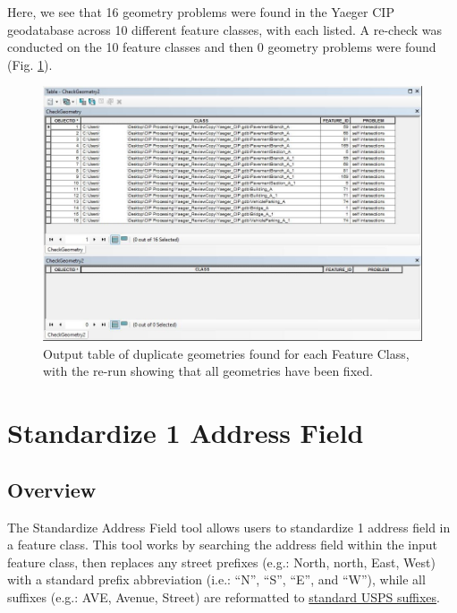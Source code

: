 \documentclass[openany]{book}
\theoremstyle{definition}
\theoremstyle{definition}
\theoremstyle{definition}
\theoremstyle{remark}
\begin{document}
Here, we see that 16 geometry problems were found in the Yaeger CIP
geodatabase across 10 different feature classes, with each listed. A
re-check was conducted on the 10 feature classes and then 0 geometry
problems were found (Fig. \ref{fig:chkGafter}).

\begin{figure}[H]

{\centering \includegraphics[width=4.76in,]{figures/chkG-after} 

}

\caption{Output table of duplicate geometries found for each Feature Class, with the re-run showing that all geometries have been fixed.}\label{fig:chkGafter}
\end{figure}

\hypertarget{stdAdd1}{\chapter{Standardize 1 Address
Field}\label{stdAdd1}}

\section{Overview}\label{overview-6}

The Standardize Address Field tool allows users to standardize 1 address
field in a feature class. This tool works by searching the address field
within the input feature class, then replaces any street prefixes (e.g.:
North, north, East, West) with a standard prefix abbreviation (i.e.:
``N'', ``S'', ``E'', and ``W''), while all suffixes (e.g.: AVE, Avenue,
Street) are reformatted to
\href{https://github.com/allanbreyes/udacity-data-science/blob/master/p2/data/suffixes.csv}{standard
USPS suffixes}.
\end{document}

